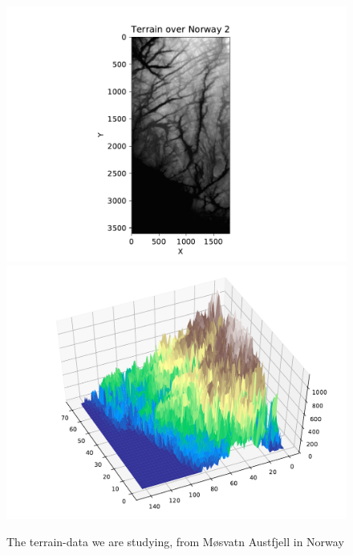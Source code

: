 \documentclass[a4paper,10pt,english]{article}
\begin{document}
\begin{figure}[h!]
	\centering 
	\includegraphics[scale=0.52]{../results/part_g_input.pdf}
	\includegraphics[scale=0.52]{../results/part_g_input3d.pdf}
	\caption{The terrain-data we are studying, from Møsvatn Austfjell in Norway}
	\label{part_g_input}
\end{figure}



\end{document}
